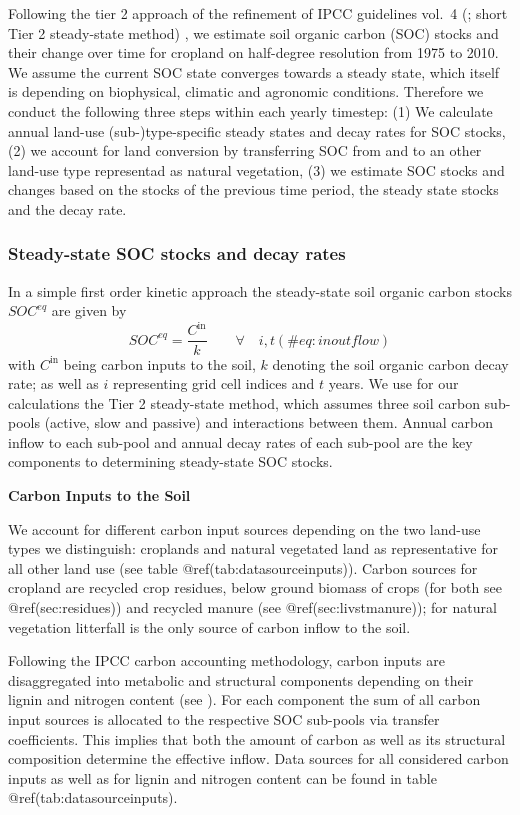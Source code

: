\documentclass[gc, manuscript]{copernicus}
\begin{document}
Following the tier 2 approach of the refinement of IPCC guidelines
vol.~4 (\citet{ipcc_2019_2019}; short Tier 2 steady-state method) , we
estimate soil organic carbon (SOC) stocks and their change over time for
cropland on half-degree resolution from 1975 to 2010. We assume the
current SOC state converges towards a steady state, which itself is
depending on biophysical, climatic and agronomic conditions. Therefore
we conduct the following three steps within each yearly timestep: (1) We
calculate annual land-use (sub-)type-specific steady states and decay
rates for SOC stocks, (2) we account for land conversion by transferring
SOC from and to an other land-use type representad as natural
vegetation, (3) we estimate SOC stocks and changes based on the stocks
of the previous time period, the steady state stocks and the decay rate.

\subsubsection{Steady-state SOC stocks and decay rates}

In a simple first order kinetic approach the steady-state soil organic
carbon stocks \(SOC^{eq}\) are given by \begin{equation}
SOC^{eq} =\frac{C^{\textrm{in}}}{k} \qquad\forall\quad i,t
(\#eq:inoutflow)
\end{equation} with \(C^{\textrm{in}}\) being carbon inputs to the soil,
\(k\) denoting the soil organic carbon decay rate; as well as \(i\)
representing grid cell indices and \(t\) years. We use for our
calculations the Tier 2 steady-state method, which assumes three soil
carbon sub-pools (active, slow and passive) and interactions between
them. Annual carbon inflow to each sub-pool and annual decay rates of
each sub-pool are the key components to determining steady-state SOC
stocks.

\textbf{Carbon Inputs to the Soil}

We account for different carbon input sources depending on the two
land-use types we distinguish: croplands and natural vegetated land as
representative for all other land use (see table
@ref(tab:datasourceinputs)). Carbon sources for cropland are recycled
crop residues, below ground biomass of crops (for both see
@ref(sec:residues)) and recycled manure (see @ref(sec:livstmanure)); for
natural vegetation litterfall \citep{schaphoff_lpjml4_2018} is the only
source of carbon inflow to the soil.

Following the IPCC carbon accounting methodology, carbon inputs are
disaggregated into metabolic and structural components depending on
their lignin and nitrogen content (see \citet{ipcc_2019_2019}). For each
component the sum of all carbon input sources is allocated to the
respective SOC sub-pools via transfer coefficients. This implies that
both the amount of carbon as well as its structural composition
determine the effective inflow. Data sources for all considered carbon
inputs as well as for lignin and nitrogen content can be found in table
@ref(tab:datasourceinputs).
\end{document}
